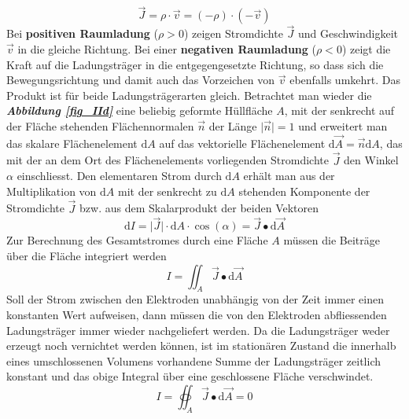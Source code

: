 \begin{equation}
\boxed{\overrightarrow{J}=\rho\cdot \overrightarrow{v}=\left(-\rho\right)\cdot \left(-\overrightarrow{v}\right)}
\end{equation}
Bei \textbf{positiven Raumladung} ($\rho>0$) zeigen Stromdichte $\overrightarrow{J}$ und Geschwindigkeit $\overrightarrow{v}$ in die gleiche Richtung. Bei einer \textbf{negativen Raumladung} ($\rho<0$) zeigt die Kraft auf die Ladungsträger in die entgegengesetzte Richtung, so dass sich die Bewegungsrichtung und damit auch das Vorzeichen von $\overrightarrow{v}$ ebenfalls umkehrt. Das Produkt ist für beide Ladungsträgerarten gleich.
\newline\newline
Betrachtet man wieder die \textbf{\textit{Abbildung \ref{fig_IId}}} eine beliebig geformte Hüllfläche $A$, mit der senkrecht auf der Fläche stehenden Flächennormalen $\overrightarrow{n}$ der Länge $\Big\vert\overrightarrow{n}\Big\vert=1$ und erweitert man das skalare Flächenelement $\text{d}A$ auf das vektorielle Flächenelement $\text{d}\overrightarrow{A}=\overrightarrow{n}\text{d}A$, das mit der an dem Ort des Flächenelements vorliegenden Stromdichte $\overrightarrow{J}$ den Winkel $\alpha$ einschliesst. Den elementaren Strom durch $\text{d}A$ erhält man aus der Multiplikation von $\text{d}A$ mit der senkrecht zu $\text{d}A$ stehenden Komponente der Stromdichte $\overrightarrow{J}$ bzw. aus dem Skalarprodukt der beiden Vektoren
\begin{equation} 
\boxed{\text{d}I=\Big\vert\overrightarrow{J}\Big\vert\cdot \text{d}A\cdot \cos\left(\alpha\right)=\overrightarrow{J}\bullet\text{d}\overrightarrow{A}}
\end{equation} 
Zur Berechnung des Gesamtstromes durch eine Fläche $A$ müssen die Beiträge über die Fläche integriert werden
\begin{equation}
\boxed{I=\displaystyle \iint_{A}\overrightarrow{J}\bullet \text{d}\overrightarrow{A}} 
\end{equation} 
Soll der Strom zwischen den Elektroden unabhängig von der Zeit immer einen konstanten Wert aufweisen, dann müssen die von den Elektroden abfliessenden Ladungsträger immer wieder nachgeliefert werden. Da die Ladungsträger weder erzeugt noch vernichtet werden können, ist im stationären Zustand die innerhalb eines umschlossenen Volumens vorhandene Summe der Ladungsträger zeitlich konstant und das obige Integral über eine geschlossene Fläche verschwindet.
\begin{equation}
\boxed{I=\displaystyle \oiint_{A}\overrightarrow{J}\bullet \text{d}\overrightarrow{A}=0}
\end{equation}
